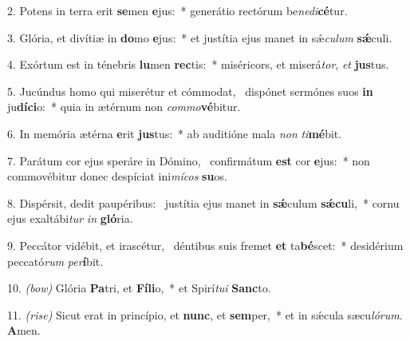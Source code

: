 2. Potens in terra erit \textbf{se}men \textbf{e}jus:~* generátio rectórum be\textit{ne}\textit{di}\textbf{cé}tur.

3. Glória, et divítiæ in \textbf{do}mo \textbf{e}jus:~* et justítia ejus manet in s\'{\ae}\textit{cu}\textit{lum} \textbf{s\'{\ae}}culi.

4. Exórtum est in ténebris \textbf{lu}men \textbf{rec}tis:~* miséricors, et miserá\textit{tor}, \textit{et} \textbf{jus}tus.

5. Jucúndus homo qui miserétur et cómmodat,~{\color{red}\GreDagger} dispónet sermónes suos \textbf{in} ju\textbf{dí}\textbf{ci}o:~* quia in ætérnum non \textit{com}\textit{mo}\textbf{vé}bitur.

6. In memória ætérna \textbf{e}rit \textbf{jus}tus:~* ab auditióne mala \textit{non} \textit{ti}\textbf{mé}bit.

7. Parátum cor ejus speráre in Dómino,~{\color{red}\GreDagger} confirmátum \textbf{est} cor \textbf{e}jus:~* non commovébitur donec despíciat ini\textit{mí}\textit{cos} \textbf{su}os.

8. Dispérsit, dedit paupéribus:~{\color{red}\GreDagger} justítia ejus manet in \textbf{s\'{\ae}}culum \textbf{s\'{\ae}}\textbf{cu}li,~* cornu ejus exaltábi\textit{tur} \textit{in} \textbf{gló}ria.

9. Peccátor vidébit, et irascétur,~{\color{red}\GreDagger} déntibus suis fremet \textbf{et} ta\textbf{bé}scet:~* desidérium peccató\textit{rum} \textit{per}\textbf{í}bit.

10. {\color{red}\textit{(bow)}} Glória \textbf{Pa}tri, et \textbf{Fí}\textbf{li}o,~* et Spirí\textit{tu}\textit{i} \textbf{Sanc}to.

11. {\color{red}\textit{(rise)}} Sicut erat in princípio, et \textbf{nunc}, et \textbf{sem}per,~* et in s\'{\ae}cula sæcu\textit{ló}\textit{rum}. \textbf{A}men.